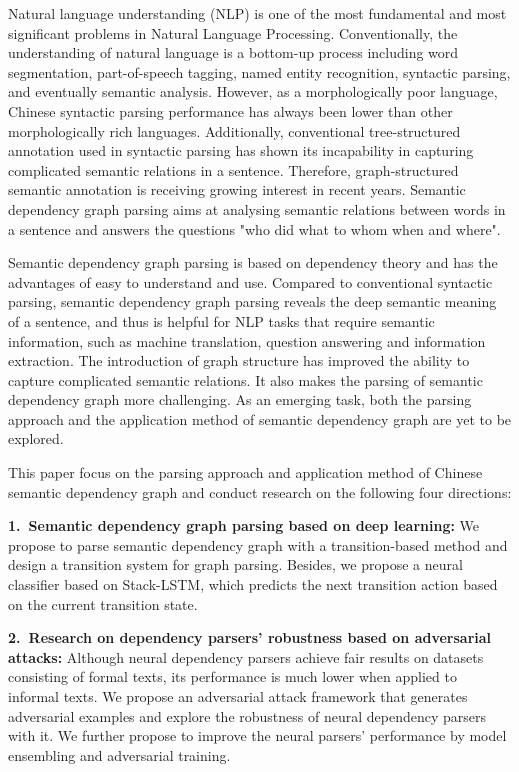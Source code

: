 \begin{eabstract}

Natural language understanding (NLP) is one of the most fundamental and most significant problems in Natural Language Processing. 
Conventionally, the understanding of natural language is a bottom-up process including word segmentation, part-of-speech tagging, named entity recognition, syntactic parsing, and eventually semantic analysis. 
However, as a morphologically poor language, Chinese syntactic parsing performance has always been lower than other morphologically rich languages. 
Additionally, conventional tree-structured annotation used in syntactic parsing has shown its incapability in capturing complicated semantic relations in a sentence. 
Therefore, graph-structured semantic annotation is receiving growing interest in recent years. 
Semantic dependency graph parsing aims at analysing semantic relations between words in a sentence and answers the questions "who did what to whom when and where". 

Semantic dependency graph parsing is based on dependency theory and has the advantages of easy to understand and use. 
Compared to conventional syntactic parsing, semantic dependency graph parsing reveals the deep semantic meaning of a sentence, and thus is helpful for NLP tasks that require semantic information, such as machine translation, question answering and information extraction. 
The introduction of graph structure has improved the ability to capture complicated semantic relations. 
It also makes the parsing of semantic dependency graph more challenging. 
As an emerging task, both the parsing approach and the application method of semantic dependency graph are yet to be explored. 

This paper focus on the parsing approach and application method of Chinese semantic dependency graph and conduct research on the following four directions: 

\textbf{1.\ Semantic dependency graph parsing based on deep learning:} 
We propose to parse semantic dependency graph with a transition-based method and design a transition system for graph parsing. 
Besides, we propose a neural classifier based on Stack-LSTM, which predicts the next transition action based on the current transition state. 

\textbf{2.\ Research on dependency parsers' robustness based on adversarial attacks:} 
Although neural dependency parsers achieve fair results on datasets consisting of formal texts, its performance is much lower when applied to informal texts. 
We propose an adversarial attack framework that generates adversarial examples and explore the robustness of neural dependency parsers with it. 
We further propose to improve the neural parsers' performance by model ensembling and adversarial training. 


\end{eabstract}
